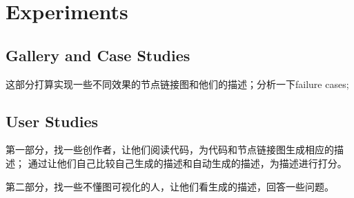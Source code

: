 \section{Experiments}
\subsection{Gallery and Case Studies}
这部分打算实现一些不同效果的节点链接图和他们的描述；分析一下failure cases;
\subsection{User Studies}
第一部分，找一些创作者，让他们阅读代码，为代码和节点链接图生成相应的描述；
通过让他们自己比较自己生成的描述和自动生成的描述，为描述进行打分。

第二部分，找一些不懂图可视化的人，让他们看生成的描述，回答一些问题。